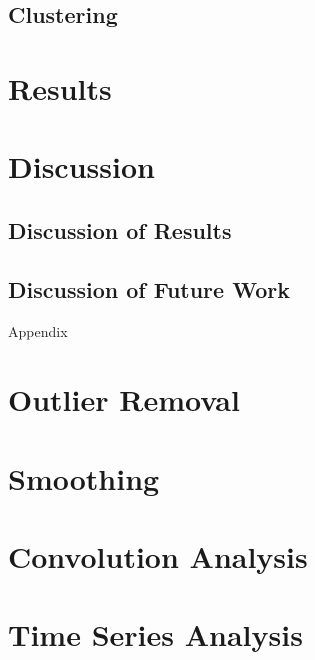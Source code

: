\documentclass[11pt]{article}
\begin{document}
		

	\subsection{Clustering}
	
		
		
\section{Results} \label{results}
		
	

\section{Discussion} \label{discussion}
	
	\subsection{Discussion of Results}
		
		
		
	\subsection{Discussion of Future Work}
	
		
		

\pagebreak

\begin{center}
\Huge{Appendix} \appendix
\end{center}


\section{Outlier Removal} \label{app_outliers}



\section{Smoothing} \label{app_smoothing}



\section{Convolution Analysis} \label{app_convolution}



\section{Time Series Analysis} \label{app_time}




\end{document}
